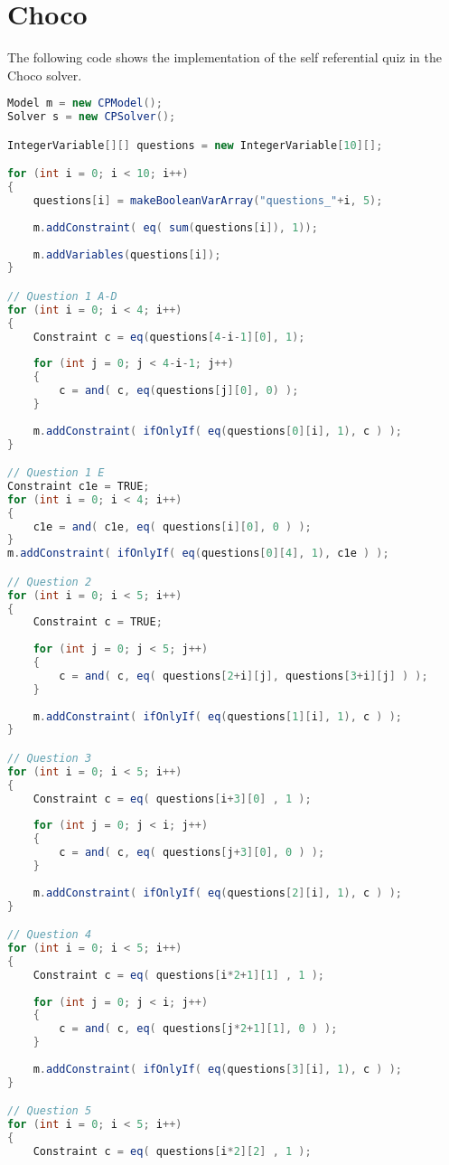 \section{Choco}
\label{implementation:choco}

The following code shows the implementation of the self referential quiz in the Choco
solver.

\begin{lstlisting}[language=Java]
Model m = new CPModel();
Solver s = new CPSolver();

IntegerVariable[][] questions = new IntegerVariable[10][];

for (int i = 0; i < 10; i++)
{
	questions[i] = makeBooleanVarArray("questions_"+i, 5);
	
	m.addConstraint( eq( sum(questions[i]), 1));
	
	m.addVariables(questions[i]);
}

// Question 1 A-D
for (int i = 0; i < 4; i++)
{
	Constraint c = eq(questions[4-i-1][0], 1);
	
	for (int j = 0; j < 4-i-1; j++)
	{
		c = and( c, eq(questions[j][0], 0) );
	}
	
	m.addConstraint( ifOnlyIf( eq(questions[0][i], 1), c ) );
}

// Question 1 E
Constraint c1e = TRUE;
for (int i = 0; i < 4; i++)
{
	c1e = and( c1e, eq( questions[i][0], 0 ) );
}
m.addConstraint( ifOnlyIf( eq(questions[0][4], 1), c1e ) );

// Question 2
for (int i = 0; i < 5; i++)
{
	Constraint c = TRUE;
	
	for (int j = 0; j < 5; j++)
	{
		c = and( c, eq( questions[2+i][j], questions[3+i][j] ) );
	}
	
	m.addConstraint( ifOnlyIf( eq(questions[1][i], 1), c ) );
}

// Question 3
for (int i = 0; i < 5; i++)
{
	Constraint c = eq( questions[i+3][0] , 1 );
	
	for (int j = 0; j < i; j++)
	{
		c = and( c, eq( questions[j+3][0], 0 ) );
	}
	
	m.addConstraint( ifOnlyIf( eq(questions[2][i], 1), c ) );
}

// Question 4
for (int i = 0; i < 5; i++)
{
	Constraint c = eq( questions[i*2+1][1] , 1 );
	
	for (int j = 0; j < i; j++)
	{
		c = and( c, eq( questions[j*2+1][1], 0 ) );
	}
	
	m.addConstraint( ifOnlyIf( eq(questions[3][i], 1), c ) );
}

// Question 5
for (int i = 0; i < 5; i++)
{
	Constraint c = eq( questions[i*2][2] , 1 );
	

\end{lstlisting}
